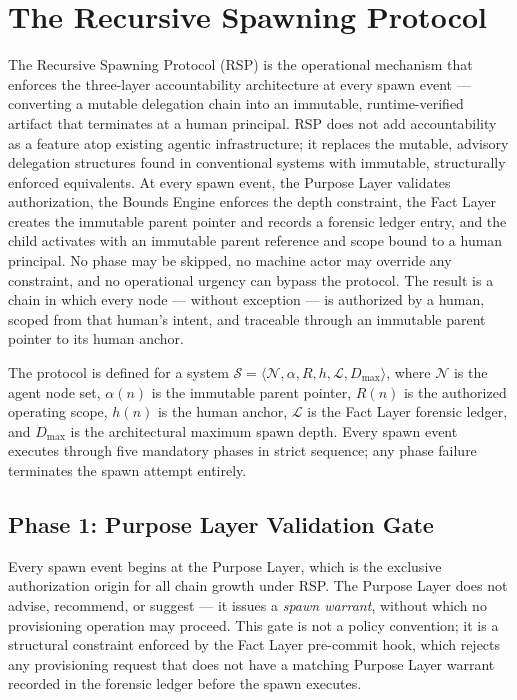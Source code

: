 \section{The Recursive Spawning Protocol}
\label{sec:rs-protocol}

The Recursive Spawning Protocol (RSP) is the operational mechanism that enforces the \bxthree{} three-layer accountability architecture at every spawn event — converting a mutable delegation chain into an immutable, runtime-verified artifact that terminates at a human principal. RSP does not add accountability as a feature atop existing agentic infrastructure; it replaces the mutable, advisory delegation structures found in conventional systems with immutable, structurally enforced equivalents. At every spawn event, the Purpose Layer validates authorization, the Bounds Engine enforces the depth constraint, the Fact Layer creates the immutable parent pointer and records a forensic ledger entry, and the child activates with an immutable parent reference and scope bound to a human principal. No phase may be skipped, no machine actor may override any constraint, and no operational urgency can bypass the protocol. The result is a chain in which every node — without exception — is authorized by a human, scoped from that human's intent, and traceable through an immutable parent pointer to its human anchor.

The protocol is defined for a system $\mathcal{S} = \langle \mathcal{N}, \alpha, R, h, \mathcal{L}, D_{\max} \rangle$, where $\mathcal{N}$ is the agent node set, $\alpha(n)$ is the immutable parent pointer, $R(n)$ is the authorized operating scope, $h(n)$ is the human anchor, $\mathcal{L}$ is the Fact Layer forensic ledger, and $D_{\max}$ is the architectural maximum spawn depth. Every spawn event executes through five mandatory phases in strict sequence; any phase failure terminates the spawn attempt entirely.

\subsection{Phase 1: Purpose Layer Validation Gate}
\label{sec:rs-phase1}

Every spawn event begins at the Purpose Layer, which is the exclusive authorization origin for all chain growth under RSP. The Purpose Layer does not advise, recommend, or suggest — it issues a \emph{spawn warrant}, without which no provisioning operation may proceed. This gate is not a policy convention; it is a structural constraint enforced by the Fact Layer pre-commit hook, which rejects any provisioning request that does not have a matching Purpose Layer warrant recorded in the forensic ledger before the spawn executes.


